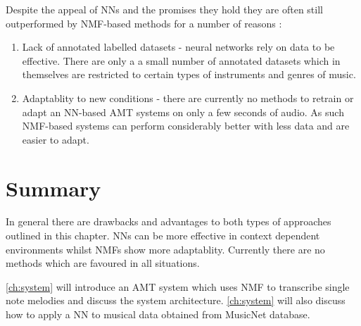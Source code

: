 Despite the appeal of NNs and the promises they hold they are often still
outperformed by NMF-based methods for a number of reasons :
\begin{enumerate}
  \item Lack of annotated labelled datasets - neural networks rely on data to be
        effective. There are only a a small number of annotated datasets which
        in themselves are restricted to certain types of instruments and genres
        of music. \cite{ground-truths:Su}
  \item Adaptablity to new conditions - there are currently no methods to
        retrain or adapt an NN-based AMT systems on only a few seconds of audio.
        As such NMF-based systems can perform considerably better with less data
        and are easier to adapt.
\end{enumerate}

\section{Summary}

In general there are drawbacks and advantages to both types of approaches
outlined in this chapter. NNs can be more effective in context dependent
environments whilst NMFs show more adaptablity. Currently there are no methods
which are favoured in all situations.

\autoref{ch:system} will introduce an AMT system which uses NMF to transcribe
single note melodies and discuss the system architecture. \autoref{ch:system}
will also discuss how to apply a NN to musical data obtained from
\citeyear{thickstun2018invariances} MusicNet database.